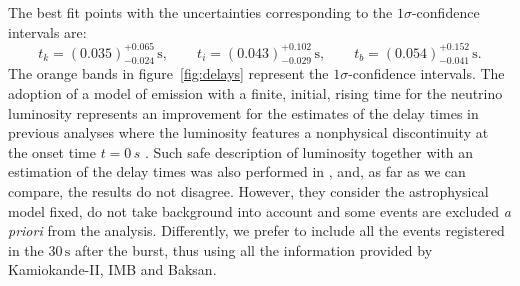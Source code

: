 \documentclass[a4paper,11pt]{article}
\begin{document}
 The best fit points with the 
uncertainties corresponding to the $1\sigma$-confidence 
intervals
are:
\begin{equation}\label{eq:delaytimefit}
      t_k=(0.035)^{+0.065}_{-0.024}\,\unit{\s},  \qquad  t_i=(0.043)^{+0.102}_{-0.029}\,\unit{\s}, \qquad   t_b=(0.054)^{+0.152}_{-0.041}\,\unit{\s} .
\end{equation}
%
The orange bands in figure~\ref{fig:delays}  represent the $1\sigma$-confidence intervals.
The adoption of a model of emission with a finite, initial, rising time for the neutrino luminosity represents
an improvement for the  estimates of the delay times in  previous analyses  where the luminosity features a nonphysical discontinuity at the onset time $t=0\,\unit{s}$ \cite{Loredo:2001rx,Pagliaroli:2008ur,DedinNeto:2023hhp}. 
%
Such safe description of luminosity together with an estimation of the delay times was also performed in \cite{Abbott:1987bm}, and, as far as we can compare, the results do not disagree. However, they consider the astrophysical model fixed,  do not take background into account and some events are excluded \textit{a priori} from the analysis. Differently, we prefer to include all the events registered in the $30\,\mbox{s}$ after the burst, thus using
all the %
information provided by Kamiokande-II, IMB and Baksan.

\end{document}
